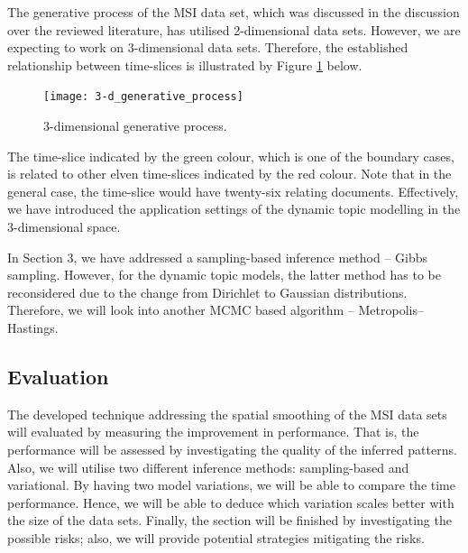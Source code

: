 \documentclass{mprop}
\begin{document}
\par The generative process of the MSI data set, which was discussed in the discussion over the reviewed literature, has utilised 2-dimensional data sets. However, we are expecting to work on 3-dimensional data sets. Therefore, the established relationship between time-slices is illustrated by Figure \ref{fig:3-d_generative_process} below.
\begin{figure}[H]
  \centering
  \texttt{[image: 3-d\_generative\_process]}
  \caption{3-dimensional generative process.}
  \label{fig:3-d_generative_process}
\end{figure}
The time-slice indicated by the green colour, which is one of the boundary cases, is related to other elven time-slices indicated by the red colour. Note that in the general case, the time-slice would have twenty-six relating documents. Effectively, we have introduced the application settings of the dynamic topic modelling in the 3-dimensional space.  

\par In Section 3, we have addressed a sampling-based inference method -- Gibbs sampling. However, for the dynamic topic models, the latter method has to be reconsidered due to the change from Dirichlet to Gaussian distributions. Therefore, we will look into another MCMC based algorithm -- Metropolis--Hastings.


\subsection{Evaluation}

\par The developed technique addressing the spatial smoothing of the MSI data sets will evaluated by measuring the improvement in performance. That is, the performance will be assessed by investigating the quality of the inferred patterns. Also, we will utilise two different inference methods: sampling-based and variational. By having two model variations, we will be able to compare the time performance. Hence, we will be able to deduce which variation scales better with the size of the data sets. Finally, the section will be finished by investigating the possible risks; also, we will provide potential strategies mitigating the risks.  
\end{document}
